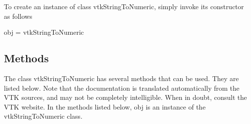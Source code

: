 To create an instance of class vtk\-String\-To\-Numeric, simply invoke its constructor as follows \begin{DoxyVerb}  obj = vtkStringToNumeric
\end{DoxyVerb}
 \hypertarget{vtkwidgets_vtkxyplotwidget_Methods}{}\subsection{Methods}\label{vtkwidgets_vtkxyplotwidget_Methods}
The class vtk\-String\-To\-Numeric has several methods that can be used. They are listed below. Note that the documentation is translated automatically from the V\-T\-K sources, and may not be completely intelligible. When in doubt, consult the V\-T\-K website. In the methods listed below, {\ttfamily obj} is an instance of the vtk\-String\-To\-Numeric class. 
